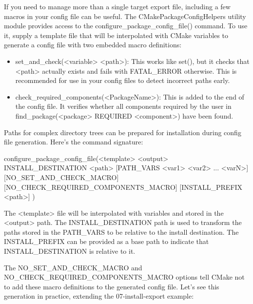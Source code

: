 
If you need to manage more than a single target export file, including a few macros in your config file can be useful. The CMakePackageConfigHelpers utility module provides access to the configure\_package\_config\_file() command. To use it, supply a template file that will be interpolated with CMake variables to generate a config file with two embedded macro definitions:

\begin{itemize}
\item
set\_and\_check(<variable> <path>): This works like set(), but it checks that <path> actually exists and fails with FATAL\_ERROR otherwise. This is recommended for use in your config files to detect incorrect paths early.

\item
check\_required\_components(<PackageName>): This is added to the end of the config file. It verifies whether all components required by the user in find\_package(<package> REQUIRED <component>) have been found.
\end{itemize}

Paths for complex directory trees can be prepared for installation during config file generation. Here’s the command signature:

\begin{shell}
configure_package_config_file(<template> <output>
    INSTALL_DESTINATION <path>
    [PATH_VARS <var1> <var2> ... <varN>]
    [NO_SET_AND_CHECK_MACRO]
    [NO_CHECK_REQUIRED_COMPONENTS_MACRO]
    [INSTALL_PREFIX <path>]
)
\end{shell}

The <template> file will be interpolated with variables and stored in the <output> path. The INSTALL\_DESTINATION path is used to transform the paths stored in the PATH\_VARS to be relative to the install destination. The INSTALL\_PREFIX can be provided as a base path to indicate that INSTALL\_DESTINATION is relative to it.

The NO\_SET\_AND\_CHECK\_MACRO and NO\_CHECK\_REQUIRED\_COMPONENTS\_MACRO options tell CMake not to add these macro definitions to the generated config file. Let’s see this generation in practice, extending the 07-install-export example:




